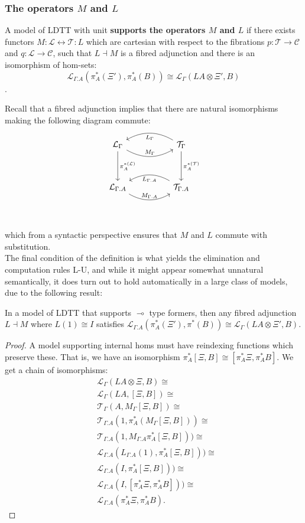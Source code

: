 \subsubsection{The operators $M$ and $L$}
\begin{defn}\label{semanticML}
  A model of LDTT with unit \textbf{supports the operators $M$ and $L$} if there exists functors $M : \mathcal{L} \leftrightarrow \mathcal{T} : L$ which are cartesian with respect to the fibrations $p : \mathcal{T} \to \mathcal{C}$ and $q : \mathcal{L} \to \mathcal{C}$, such that $L \dashv M$ is a fibred adjunction and there is an isomorphism of hom-sets:
  \[
    \mathcal{L}_{\Gamma.A}(\pi_A^*(\Xi'), \pi_A^*(B)) \cong \mathcal{L}_\Gamma(LA \otimes \Xi', B)\].
  
\end{defn}
Recall that a fibred adjunction implies that there are natural isomorphisms making the following diagram commute:
\[
  \ti
  \mathcal{L}_\Gamma  \ar[d, "\pi^{*(\mathcal{L})}_A"] \ar[r, "M_{\Gamma}", bend right] & \mathcal{T}_{\Gamma} \ar[l, "L_{\Gamma}", bend right] \ar[d, "\pi^{*(\mathcal{T})}_A"] \\
  \mathcal{L}_{\Gamma.A} \ar[r, "M_{\Gamma.A}", bend right] & \mathcal{T}_{\Gamma.A} \ar[l, "L_{\Gamma.A}", bend right]\\
  \kz
\]
which from a syntactic perspective ensures that $M$ and $L$ commute with substitution.\\
The final condition of the definition is what yields the elimination and computation rules L-U, and while it might appear somewhat unnatural semantically, it does turn out to hold automatically in a large class of models, due to the following result:
\begin{thm}In a model of LDTT that supports $\multimap$ type formers, then any fibred adjunction $L \dashv M$ where $L(1) \cong I$ satisfies $\mathcal{L}_{\Gamma.A}(\pi^*_A(\Xi'), \pi^*(B)) \cong \mathcal{L}_{\Gamma}(LA \otimes \Xi', B)$.
  \begin{proof}
    A model supporting internal homs must have reindexing functions which preserve these. That is, we have an isomorphism $\pi_A^*[\Xi, B] \cong [\pi_A^*\Xi, \pi^*_AB]$. We get a chain of isomorphisms:
\[
      \begin{split}
&        \mathcal{L}_{\Gamma}(LA \otimes \Xi, B) \cong \\
 &       \mathcal{L}_{\Gamma}(LA, [\Xi, B]) \cong \\
  &      \mathcal{T}_{\Gamma}(A, M_{\Gamma}[\Xi, B]) \cong \\
 &\mathcal{T}_{\Gamma.A}(1, \pi_A^*(M_{\Gamma}[\Xi, B])) \cong \\
 &\mathcal{T}_{\Gamma.A}(1, M_{\Gamma.A}\pi_A^*[\Xi, B])) \cong \\
  &\mathcal{L}_{\Gamma.A}(L_{\Gamma.A}(1), \pi_A^*[\Xi, B])) \cong \\
 &\mathcal{L}_{\Gamma.A}(I, \pi_A^*[\Xi, B])) \cong \\
 &\mathcal{L}_{\Gamma.A}(I, [\pi_A^*\Xi, \pi_A^*B])) \cong \\
 &\mathcal{L}_{\Gamma.A}(\pi_A^*\Xi, \pi_A^*B).
      \end{split}
\]
  \end{proof}
\end{thm}
